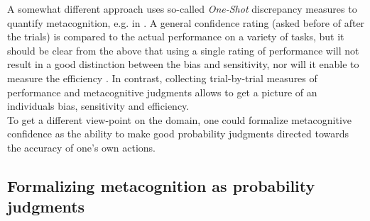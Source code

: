 \documentclass[../main/main.tex]{subfiles}
\begin{document}
	A somewhat different approach uses so-called \textit{One-Shot} discrepancy measures to quantify metacognition, e.g. in \citep{kruger1999unskilled}. A general confidence rating (asked before of after the trials) is compared to the actual performance on a variety of tasks, but it should be clear from the above that using a single rating of performance will not result in a good distinction between the bias and sensitivity, nor will it enable to measure the efficiency \citep{fleming2014measure}. In contrast, collecting trial-by-trial measures of performance and metacognitive judgments allows to get a picture of an individuals bias, sensitivity and efficiency.\\
	To get a different view-point on the domain, one could formalize metacognitive confidence as the ability to make good probability judgments directed towards the accuracy of one's own actions.
	
	\subsection{Formalizing metacognition as probability judgments}
	
\end{document}
